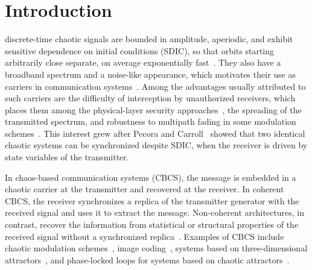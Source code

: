 \documentclass[journal]{IEEEtran}
\begin{document}
\section{Introduction}\label{sec:intro}
 discrete-time chaotic signals are bounded in
amplitude, aperiodic, and exhibit sensitive dependence on initial conditions
(SDIC), so that orbits starting arbitrarily close separate, on average
exponentially fast~\cite{Alligood1996}. They also have a broadband spectrum
and a noise-like appearance, which motivates their use as carriers in
communication systems~\cite{Baptista2021}. Among the advantages usually
attributed to such carriers are the difficulty of interception by
unauthorized receivers, which places them among the physical-layer security
approaches~\cite{Mukherjee2014}, the spreading of the transmitted spectrum,
and robustness to multipath fading in some modulation
schemes~\cite{Kaddoum2016}. This
interest grew after Pecora and Carroll~\cite{Pecora1990} showed that two
identical chaotic systems can be synchronized despite SDIC, when the
receiver is driven by state variables of the transmitter.

In chaos-based communication systems (CBCS), the message is embedded in a
chaotic carrier at the transmitter and recovered at the receiver. In
coherent CBCS, the receiver synchronizes a replica of the transmitter
generator with the received signal and uses it to extract the message.
Non-coherent architectures, in contrast, recover the information from
statistical or structural properties of the received signal without a
synchronized replica~\cite{Kaddoum2016}. Examples of CBCS include chaotic
modulation schemes~\cite{Baptista2021}, image coding~\cite{Sabatini2020},
systems based on three-dimensional
attractors~\cite{Souza2019}, and phase-locked loops for systems based on
chaotic attractors~\cite{Silva2025sbrt}.
\end{document}

